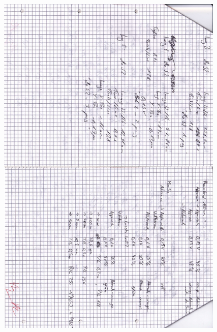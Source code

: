 \begin{appendix}
\begin{figure}[H]
\centering \includegraphics[width=0.97\textwidth]{Bilder/Protokoll/002.png}
\end{figure}  
\begin{figure}[H]

\end{figure}
\end{appendix}
